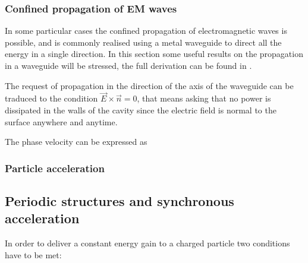 \subsubsection{Confined propagation of EM waves}

In some particular cases the confined propagation of electromagnetic waves is possible, and is commonly realised using a metal waveguide to direct all the energy in a single direction. In this section some useful results on the propagation in a waveguide will be stressed, the full derivation can be found in \cite{Botta:EM, Jackson:ClassEM}. 

The request of propagation in the direction of the axis of the waveguide can be traduced to the condition $\vec{E} \times \vec{n} = 0$, that means asking that no power is dissipated in the walls of the cavity since the electric field is normal to the surface anywhere and anytime.



The phase velocity can be expressed as 



\subsubsection[Particle acceleration]{Particle acceleration}

\cite{Kilpatrick:slides}



\subsection[Periodic structures and synchronous acceleration]{Periodic structures and synchronous acceleration}

In order to deliver a  constant energy gain to a charged particle two conditions have to be met:

